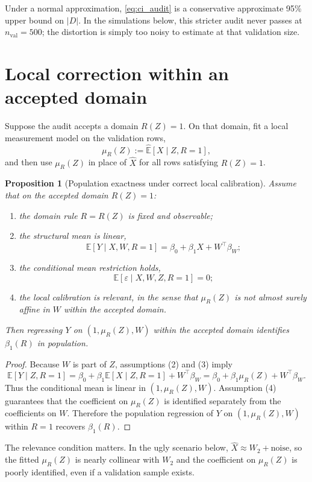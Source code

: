 \documentclass[11pt]{article}
\newtheorem{proposition}{Proposition}
\newcommand{\E}{\mathbb{E}}
\newcommand{\1}{\mathbf{1}}
\begin{document}
Under a normal approximation, \eqref{eq:ci_audit} is a conservative approximate 95\% upper bound on $|D|$. In the simulations below, this stricter audit never passes at $n_{\mathrm{val}}=500$; the distortion is simply too noisy to estimate at that validation size.

\section{Local correction within an accepted domain}

Suppose the audit accepts a domain $R(Z)=1$. On that domain, fit a local measurement model on the validation rows,
\[
\mu_R(Z):=\widehat{\E}[X\mid Z,R=1],
\]
and then use $\mu_R(Z)$ in place of $\hat X$ for all rows satisfying $R(Z)=1$.

\begin{proposition}[Population exactness under correct local calibration]
Assume that on the accepted domain $R(Z)=1$:
\begin{enumerate}[leftmargin=1.6em,label=(\arabic*)]
\item the domain rule $R=R(Z)$ is fixed and observable;
\item the structural mean is linear,
\[
\E[Y\mid X,W,R=1]=\beta_0+\beta_1 X + W^\top\beta_W;
\]
\item the conditional mean restriction holds,
\[
\E[\varepsilon\mid X,W,Z,R=1]=0;
\]
\item the local calibration is relevant, in the sense that $\mu_R(Z)$ is not almost surely affine in $W$ within the accepted domain.
\end{enumerate}
Then regressing $Y$ on $(1,\mu_R(Z),W)$ within the accepted domain identifies $\beta_1(R)$ in population.
\end{proposition}

\begin{proof}
Because $W$ is part of $Z$, assumptions (2) and (3) imply
\[
\E[Y\mid Z,R=1]
=
\beta_0 + \beta_1\E[X\mid Z,R=1] + W^\top\beta_W
=
\beta_0 + \beta_1\mu_R(Z) + W^\top\beta_W.
\]
Thus the conditional mean is linear in $(1,\mu_R(Z),W)$. Assumption (4) guarantees that the coefficient on $\mu_R(Z)$ is identified separately from the coefficients on $W$. Therefore the population regression of $Y$ on $(1,\mu_R(Z),W)$ within $R=1$ recovers $\beta_1(R)$.\qedhere
\end{proof}

The relevance condition matters. In the ugly scenario below, $\hat X \approx W_2 + \text{noise}$, so the fitted $\mu_R(Z)$ is nearly collinear with $W_2$ and the coefficient on $\mu_R(Z)$ is poorly identified, even if a validation sample exists.
\end{document}
